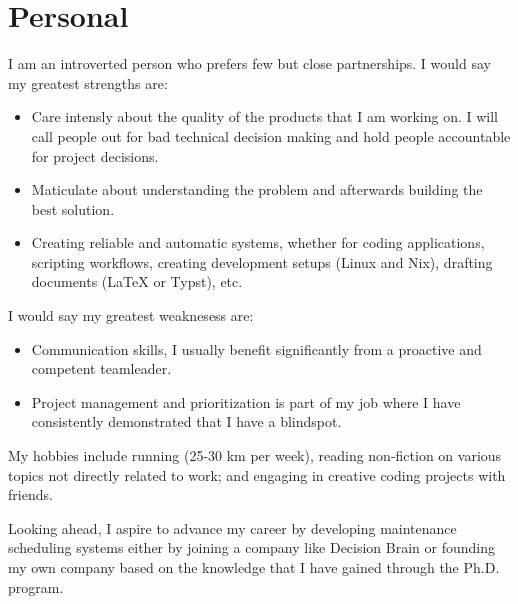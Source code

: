 \section{Personal}

I am an introverted person who prefers few but close partnerships. I would say my greatest strengths are:
\begin{itemize}
	\item Care intensly about the quality of the products that I am working on. I will call people out for bad technical decision making and hold people accountable for project decisions.
	\item Maticulate about understanding the problem and afterwards building the best solution.
	\item Creating reliable and automatic systems, whether for coding applications, scripting workflows, creating development setups (Linux and Nix), drafting documents (LaTeX or Typst), etc.
\end{itemize}

I would say my greatest weaknesess are:
\begin{itemize}
	\item Communication skills, I usually benefit significantly from a proactive and competent teamleader.
	\item Project management and prioritization is part of my job where I have consistently demonstrated that I have a blindspot.  
\end{itemize}
 
My hobbies include running (25-30 km per week), reading non-fiction on various topics not directly related to work; 
and engaging in creative coding projects with friends.

Looking ahead, I aspire to advance my career by developing maintenance scheduling systems
either by joining a company like Decision Brain or founding my own company based on the
knowledge that I have gained through the Ph.D. program.

